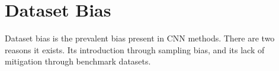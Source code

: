 \documentclass{l4proj}
\begin{document}
\section{Dataset Bias}
Dataset bias is the prevalent bias present in CNN methods. There are two reasons it exists. Its introduction through sampling bias, and its lack of mitigation through benchmark datasets.

\end{document}
